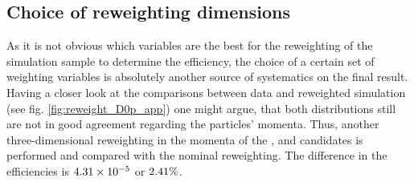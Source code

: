 \subsection{Choice of reweighting dimensions}
As it is not obvious which variables are the best for the reweighting of the \LbToDpmunuX simulation sample to determine the efficiency, the choice of a certain set of weighting variables is absolutely another source of systematics on the final result.
Having a closer look at the comparisons between data and reweighted simulation (see fig. \ref{fig:reweight_D0p_app}) one might argue, that both distributions still are not in good agreement regarding the particles' momenta.
Thus, another three-dimensional reweighting in the momenta of the \Dz\proton\mun, \Dz\mun and \Dz candidates is performed and compared with the nominal reweighting.
The difference in the efficiencies \effDp is $\num{4.31e-05}$ or $2.41\%$.

